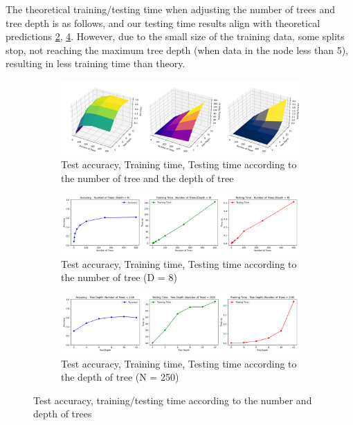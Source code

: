 The theoretical training/testing time when adjusting the number of trees and tree depth is as follows, and our testing time results align with theoretical predictions \cref{fig:q5-fig2}, \cref{fig:q5-fig3}. However, due to the small size of the training data, some splits stop, not reaching the maximum tree depth (when data in the node less than 5), resulting in less training time than theory.

\begin{figure}[htbp]
	\centering
	\begin{subfigure}[H]{\linewidth}
		\centering
		\includegraphics[width=\linewidth]{image/q5-fig1.png}
		\caption{Test accuracy, Training time, Testing time according to the number of tree and the depth of tree}
		\label{fig:q5-fig1}
	\end{subfigure}
	\begin{subfigure}[H]{\linewidth}
		\centering
		\includegraphics[width=\linewidth]{image/q5-fig2.png}
		\caption{Test accuracy, Training time, Testing time according to the number of tree (D = 8)}
		\label{fig:q5-fig2}
	\end{subfigure}
	\begin{subfigure}[H]{\linewidth}
		\centering
		\includegraphics[width=\linewidth]{image/q5-fig3.png}
		\caption{Test accuracy, Training time, Testing time according to the depth of tree (N = 250)}
		\label{fig:q5-fig3}
	\end{subfigure}
	\caption{Test accuracy, training/testing time according to the number and depth of trees}
\end{figure}
\vspace{-0.2cm}

